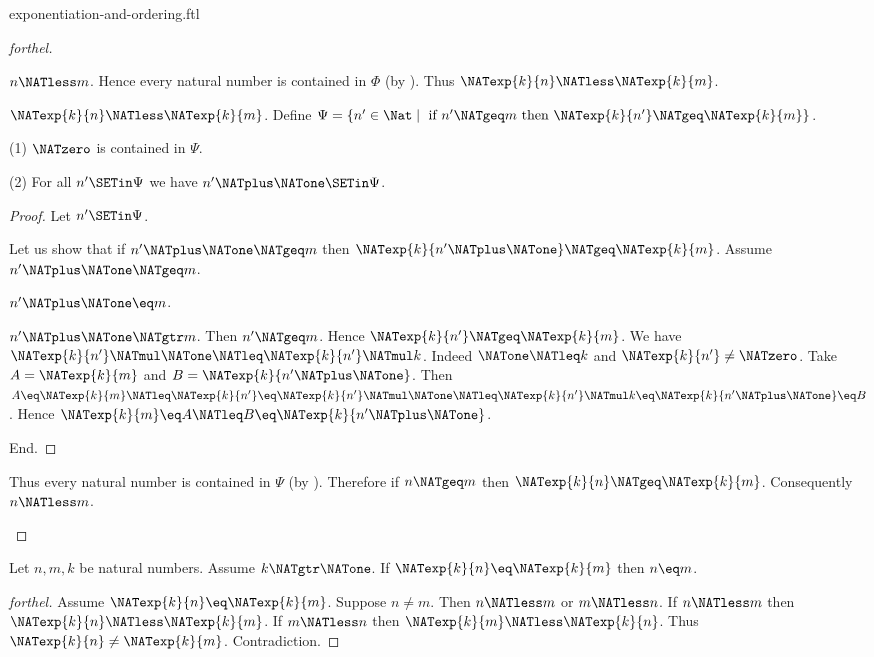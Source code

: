 \documentclass{naproche-library}
\begin{document}
\begin{smodule}[title=Exponentiation and Ordering]{exponentiation-and-ordering.ftl}
\begin{proof}[forthel]
\begin{case}{$n \NATless m$.}
    Hence every natural number is contained in $\Phi$ (by ).
    Thus $\NATexp{k}{n} \NATless \NATexp{k}{m}$.
  \end{case}

  \begin{case}{$\NATexp{k}{n} \NATless \NATexp{k}{m}$.}
    Define $\Psi = \{ n' \in \Nat \mid\text{ if }n' \NATgeq m\text{ then }
    \NATexp{k}{n'} \NATgeq \NATexp{k}{m} \}$.

    (1) $\NATzero$ is contained in $\Psi$.

    (2) For all $n' \SETin \Psi$ we have $n' \NATplus \NATone \SETin \Psi$.
    \begin{proof}
      Let $n' \SETin \Psi$.

      Let us show that if $n' \NATplus \NATone \NATgeq m$ then $\NATexp{k}{n' \NATplus \NATone} \NATgeq \NATexp{k}{m}$.
        Assume $n' \NATplus \NATone \NATgeq m$.

        \begin{case}{$n' \NATplus \NATone \eq m$.} \end{case}

        \begin{case}{$n' \NATplus \NATone \NATgtr m$.}
          Then $n' \NATgeq m$.
          Hence $\NATexp{k}{n'} \NATgeq \NATexp{k}{m}$.
          We have $\NATexp{k}{n'} \NATmul \NATone \NATleq \NATexp{k}{n'} \NATmul k$.
          Indeed $\NATone \NATleq k$ and $\NATexp{k}{n'} \neq \NATzero$.
          Take $A = \NATexp{k}{m}$ and $B = \NATexp{k}{n' \NATplus \NATone}$. %
          Then $A
            \eq \NATexp{k}{m}
            \NATleq \NATexp{k}{n'}
            \eq \NATexp{k}{n'} \NATmul \NATone
            \NATleq \NATexp{k}{n'} \NATmul k
            \eq \NATexp{k}{n' \NATplus \NATone}
            \eq B$.
          Hence $\NATexp{k}{m} \eq A \NATleq B \eq \NATexp{k}{n' \NATplus \NATone}$.
        \end{case}
      End.
    \end{proof}

    Thus every natural number is contained in $\Psi$ (by ).
    Therefore if $n \NATgeq m$ then $\NATexp{k}{n} \NATgeq \NATexp{k}{m}$.
    Consequently $n \NATless m$.
  \end{case}
\end{proof}

\begin{corollary}[forthel,id=ARITHMETIC_09_6780506905509888]
  Let $n, m, k$ be natural numbers.
  Assume $k \NATgtr \NATone$.
  If $\NATexp{k}{n} \eq \NATexp{k}{m}$ then $n \eq m$.
\end{corollary}
\begin{proof}[forthel]
  Assume $\NATexp{k}{n} \eq \NATexp{k}{m}$.
  Suppose $n \neq m$.
  Then $n \NATless m$ or $m \NATless n$.
  If $n \NATless m$ then $\NATexp{k}{n} \NATless \NATexp{k}{m}$.
  If $m \NATless n$ then $\NATexp{k}{m} \NATless \NATexp{k}{n}$.
  Thus $\NATexp{k}{n} \neq \NATexp{k}{m}$.
  Contradiction.
\end{proof}


\end{smodule}
\end{document}
